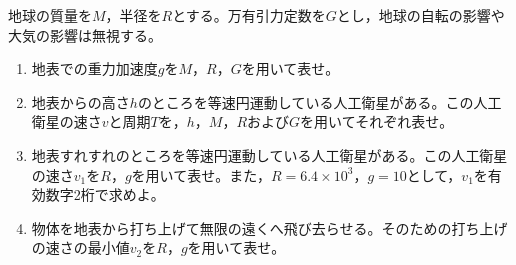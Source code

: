 \item 地球の質量を$M$，半径を$R$とする。万有引力定数を$G$とし，地球の自転の影響や大気の影響は無視する。
    \begin{enumerate}
        \item 地表での重力加速度$g$を$M$，$R$，$G$を用いて表せ。
        \item 地表からの高さ$h$のところを等速円運動している人工衛星がある。この人工衛星の速さ$v$と周期$T$を，$h$，$M$，$R$および$G$を用いてそれぞれ表せ。
        \item 地表すれすれのところを等速円運動している人工衛星がある。この人工衛星の速さ$v_1$を$R$，$g$を用いて表せ。また，$R=6.4\times 10^3$，$g=10$として，$v_1$を有効数字2桁で求めよ。
        \item 物体を地表から打ち上げて無限の遠くへ飛び去らせる。そのための打ち上げの速さの最小値$v_2$を$R$，$g$を用いて表せ。
    \end{enumerate}